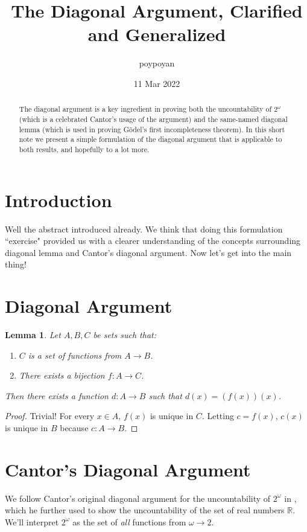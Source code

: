 \documentclass{article}
\title{The Diagonal Argument, Clarified and Generalized}
\author{poypoyan}
\date{11 Mar 2022}   %
\newtheorem{lemma}[theorem]{Lemma}
\begin{document}
\maketitle

\begin{abstract}
The diagonal argument is a key ingredient in proving both the uncountability of $2^{\omega}$ (which is a celebrated Cantor's usage of the argument) and the same-named diagonal lemma (which is used in proving Gödel's first incompleteness theorem). In this short note we present a simple formulation of the diagonal argument that is applicable to both results, and hopefully to a lot more.
\end{abstract}

\section{Introduction}
Well the abstract introduced already. We think that doing this formulation ``exercise" provided us with a clearer understanding of the concepts surrounding diagonal lemma and Cantor's diagonal argument. Now let's get into the main thing!

\section{Diagonal Argument}
\begin{lemma}\label{diag-arg}
Let $A, B, C$ be sets such that:
\begin{enumerate}
	\item $C$ is a set of functions from $A \rightarrow B$.
	\item There exists a bijection $f:A \rightarrow C$.
\end{enumerate}
Then there exists a function $d:A \rightarrow B$ such that $d(x) = (f(x))(x)$.
\end{lemma}
\begin{proof}
Trivial! For every $x \in A$, $f(x)$ is unique in $C$. Letting $c = f(x)$, $c(x)$ is unique in $B$ because $c:A \rightarrow B$.
\end{proof}

\section{Cantor's Diagonal Argument}
We follow Cantor's original diagonal argument for the uncountability of $2^{\omega}$ in \cite{cantor}, which he further used to show the uncountability of the set of real numbers $\mathbb{R}$. We'll interpret $2^{\omega}$ as the set of \textit{all} functions from $\omega \rightarrow 2$.
\end{document}
